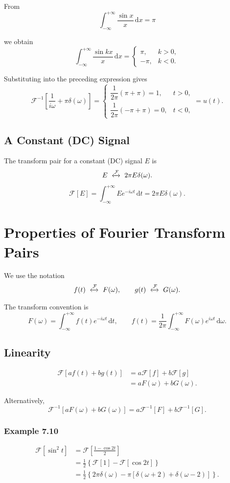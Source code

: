 \documentclass[11pt,a4paper]{article}
\theoremstyle{definition}
\theoremstyle{plain}
\begin{document}
From
\[
\int_{-\infty}^{+\infty}\frac{\sin x}{x}\,\mathrm dx=\pi
\]

we obtain
\[
\int_{-\infty}^{+\infty}\frac{\sin kx}{x}\,\mathrm dx
=
\begin{cases}
\pi,&k>0,\\
-\pi,&k<0.
\end{cases}
\]

Substituting into the preceding expression gives
\[
\mathcal F^{-1}\!\left[
\frac1{i\omega}+\pi\delta(\omega)
\right]
=
\begin{cases}
\dfrac1{2\pi}(\pi+\pi)=1,&t>0,\\[4pt]
\dfrac1{2\pi}(-\pi+\pi)=0,&t<0,
\end{cases}
=u(t).
\]

\subsection{A Constant (DC) Signal}

The transform pair for a constant (DC) signal \(E\) is
\[
E\ \xleftrightarrow{\mathcal F}\ 2\pi E\delta(\omega).
\]
\[
\mathcal F[E]
=\int_{-\infty}^{+\infty}Ee^{-i\omega t}\,\mathrm dt
=2\pi E\delta(\omega).
\]

\section{Properties of Fourier Transform Pairs}

We use the notation
\[
f(t)\ \xleftrightarrow{\mathcal F}\ F(\omega),
\qquad
g(t)\ \xleftrightarrow{\mathcal F}\ G(\omega).
\]

The transform convention is
\[
F(\omega)=\int_{-\infty}^{+\infty}f(t)e^{-i\omega t}\,\mathrm dt,
\qquad
f(t)=\frac1{2\pi}\int_{-\infty}^{+\infty}F(\omega)e^{i\omega t}\,\mathrm d\omega.
\]

\subsection{Linearity}
\[
\begin{aligned}
\mathcal F[af(t)+bg(t)]
&=a\mathcal F[f]+b\mathcal F[g]\\
&=aF(\omega)+bG(\omega).
\end{aligned}
\]

Alternatively,
\[
\mathcal F^{-1}[aF(\omega)+bG(\omega)]
=a\mathcal F^{-1}[F]+b\mathcal F^{-1}[G].
\]

\subsubsection*{Example 7.10}
\[
\begin{aligned}
\mathcal F[\sin^2t]
&=\mathcal F\!\left[\frac{1-\cos2t}{2}\right]\\
&=\frac12\left\{\mathcal F[1]-\mathcal F[\cos2t]\right\}\\
&=\frac12\left\{
2\pi\delta(\omega)
-\pi[\delta(\omega+2)+\delta(\omega-2)]
\right\}.
\end{aligned}
\]
\end{document}
